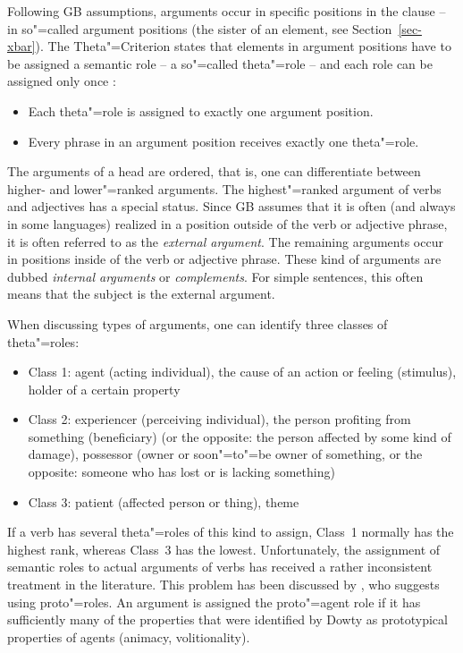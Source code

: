 Following GB assumptions, arguments occur in specific positions in the clause -- in so"=called argument positions (\eg the sister of 
an \xnull element, see Section~\ref{sec-xbar}). The Theta"=Criterion states that elements in argument positions have to be assigned
a semantic role -- a so"=called theta"=role -- and
each role can be assigned only once \citep[]{Chomsky81a}:
\begin{principle-break}[Theta"=Criterion]\label{theta-Kriterium}
\begin{itemize}
\item Each theta"=role is assigned to exactly one argument position.
\item Every phrase in an argument position receives exactly one theta"=role.
\end{itemize}
\end{principle-break}
\noindent
The arguments of a head are ordered, that is, one can differentiate between higher- and lower"=ranked arguments. The highest"=ranked
argument of verbs and adjectives has a special status. Since GB assumes that it is often (and always in some languages) realized in a position
outside of the verb or adjective phrase, it is often referred to as the \emph{external argument}. The remaining
arguments occur in positions inside of the verb or adjective phrase. These kind of arguments are dubbed 
\emph{internal arguments} or \emph{complements}. For simple sentences, this often means that the subject
is the external argument.

When discussing types of arguments, one can identify three classes of theta"=roles:
\begin{itemize}
\item Class 1: agent (acting individual), the cause of an action or feeling (stimulus), holder of a certain property
\item Class 2: experiencer (perceiving individual), the person profiting from something (beneficiary)
(or the opposite: the person affected by some kind of damage), possessor (owner or soon"=to"=be owner of something, or the opposite:
someone who has lost or is lacking something) 
\item Class 3: patient (affected person or thing), theme
\end{itemize}
If a verb has several theta"=roles of this kind to assign, Class~1 normally has the highest rank, whereas Class~3 has the lowest.
Unfortunately, the assignment of semantic roles to actual arguments of verbs has received a rather inconsistent treatment in the 
literature. This problem has been discussed by \citet{Dowty91a}, who suggests using proto"=roles. An argument is assigned the
proto"=agent role if it has sufficiently many of the properties that were identified by Dowty as prototypical properties of agents (\eg animacy, volitionality).%
\nocite{Gruber65a-u,Fillmore68,Fillmore71a-u,Jackendoff72a-u,Dowty91a}

